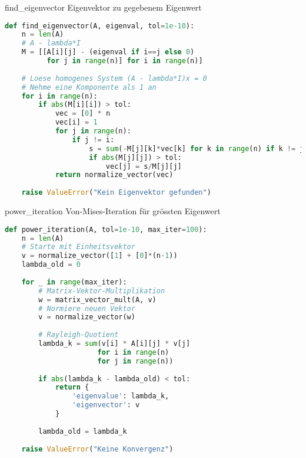 \begin{examplecode}{find\_eigenvector} Eigenvektor zu gegebenem Eigenwert
\begin{lstlisting}[language=Python, style=basesmol]
def find_eigenvector(A, eigenval, tol=1e-10):
    n = len(A)
    # A - lambda*I
    M = [[A[i][j] - (eigenval if i==j else 0) 
          for j in range(n)] for i in range(n)]
    
    # Loese homogenes System (A - lambda*I)x = 0
    # Nehme eine Komponente als 1 an
    for i in range(n):
        if abs(M[i][i]) > tol:
            vec = [0] * n
            vec[i] = 1
            for j in range(n):
                if j != i:
                    s = sum(-M[j][k]*vec[k] for k in range(n) if k != j)
                    if abs(M[j][j]) > tol:
                        vec[j] = s/M[j][j]
            return normalize_vector(vec)
            
    raise ValueError("Kein Eigenvektor gefunden")
\end{lstlisting}
\end{examplecode}




\begin{examplecode}{power\_iteration} Von-Mises-Iteration für grössten Eigenwert
\begin{lstlisting}[language=Python, style=basesmol]
def power_iteration(A, tol=1e-10, max_iter=100):
    n = len(A)
    # Starte mit Einheitsvektor
    v = normalize_vector([1] + [0]*(n-1))
    lambda_old = 0
    
    for _ in range(max_iter):
        # Matrix-Vektor-Multiplikation
        w = matrix_vector_mult(A, v)
        # Normiere neuen Vektor
        v = normalize_vector(w)
        
        # Rayleigh-Quotient
        lambda_k = sum(v[i] * A[i][j] * v[j] 
                      for i in range(n) 
                      for j in range(n))
        
        if abs(lambda_k - lambda_old) < tol:
            return {
                'eigenvalue': lambda_k,
                'eigenvector': v
            }
            
        lambda_old = lambda_k
        
    raise ValueError("Keine Konvergenz")
\end{lstlisting}
\end{examplecode}

